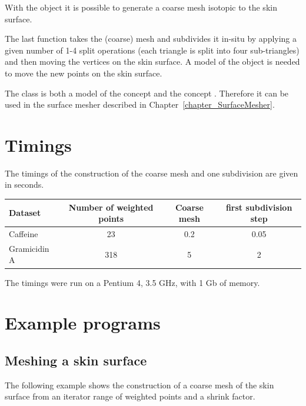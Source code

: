 With the  object it is possible to generate a
coarse mesh isotopic to the skin surface. 


The last function takes the (coarse) mesh and subdivides it in-situ by
applying a given number of 1-4 split operations (each triangle is
split into four sub-triangles) and then moving the vertices on the
skin surface. A model of the  object is needed to
move the new points on the skin surface.

%
The class  is both a model of the concept
 and the concept .
Therefore it can be used in the surface mesher described in
Chapter~\ref{chapter_SurfaceMesher}.

\section{Timings}
The timings of the construction of the coarse mesh and one subdivision
are given in seconds.
\begin{center}
  \begin{tabular}{|l|c|c|c|}
    \hline
    Dataset & Number of weighted points & Coarse mesh & first subdivision step\\
    \hline
    \hline
    Caffeine& 23 & 0.2 & 0.05 \\
    Gramicidin A& 318 & 5 & 2\\
    \hline
  \end{tabular}
\end{center}
The timings were run on a Pentium 4, 3.5 GHz, with 1 Gb of memory.
\section{Example programs}
\subsection{Meshing a skin surface}
The following example shows the construction of a coarse mesh of the
skin surface from an iterator range of weighted points and a shrink factor.

